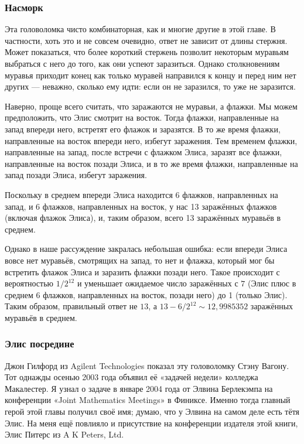 \subsubsection*{Насморк}

Эта головоломка чисто комбинаторная, как и многие другие в этой главе.
В частности, хоть это и не совсем очевидно, ответ не зависит от длины стержня.
Может показаться, что более короткий стержень позволит некоторым муравьям выбраться с него до того, как они успеют заразиться.
Однако столкновениям муравья приходит конец как только муравей направился к концу и перед ним нет других --- неважно, сколько ему идти: если он не заразился, то уже не заразится.

Наверно, проще всего считать, что заражаются не муравьи, а флажки.
Мы можем предположить, что Элис смотрит на восток.
Тогда флажки, направленные на запад впереди него, встретят его флажок и заразятся.
В то же время флажки, направленные на восток впереди него, избегут заражения.
Тем временем флажки, направленные на запад, после встречи с флажком Элиса, заразят все флажки, направленные на восток позади Элиса, и в то же время флажки, направленные на запад позади Элиса, избегут заражения.

Поскольку в среднем впереди Элиса находится 6 флажков, направленных на запад, и 6 флажков, направленных на восток, у нас 13 заражённых флажков (включая флажок Элиса), и, таким образом, всего 13 заражённых муравьёв в среднем.

Однако в наше рассуждение закралась небольшая ошибка: если впереди Элиса вовсе нет муравьёв, смотрящих на запад, то нет и флажка, который мог бы встретить флажок Элиса и заразить флажки позади него.
Такое происходит с вероятностью $1/2^{12}$ и уменьшает ожидаемое число заражённых с $7$ (Элис плюс в среднем 6 флажков, направленных на восток, позади него) до 1 (только Элис).
Таким образом, правильный ответ не $13$, а $13 - 6/2^{12} \sim 12{,}9985352$ заражённых муравьёв в среднем.

\subsubsection*{Элис посредине}

Джон Гилфорд из Agilent Technologies показал эту головоломку Стэну Вагону.
Тот однажды осенью 2003 года объявил её «задачей недели» колледжа Макалестер.
Я узнал о задаче в январе 2004 года от Элвина Берлекэмпа на конференции «Joint Mathematics Meetings» в Финиксе.
Именно тогда главный герой этой главы получил своё имя;
думаю, что у Элвина на самом деле есть тётя Элис.
На меня ещё повлияло и присутствие на конференции издателя этой книги, Элис Питерс из A K Peters, Ltd.

